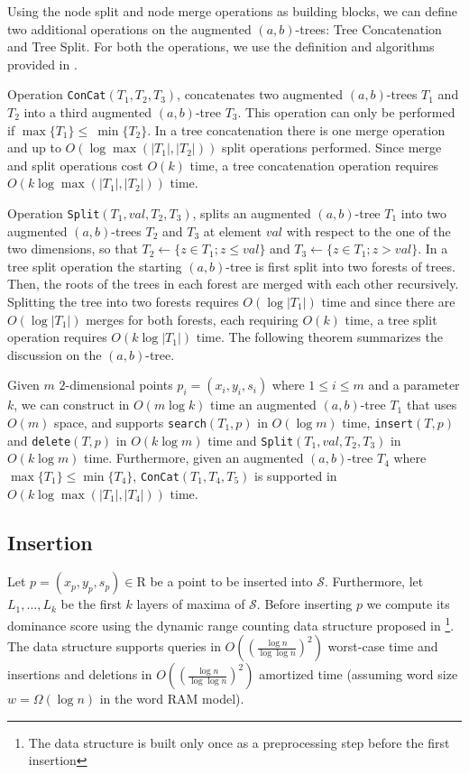 \documentclass{llncs}
\begin{document}
Using the node split and node merge operations as building blocks, we can define two additional operations on the augmented $(a,b)$-trees: Tree Concatenation and Tree Split. For both the operations, we use the definition and algorithms provided in \cite{Mehlhorn84}.

Operation \texttt{ConCat$(T_1,T_2,T_3)$}, concatenates two augmented $(a,b)$-trees $T_1$ and $T_2$ into a third augmented $(a,b)$-tree $T_3$. This operation can only be performed if $\max\{T_1\} \leq~ \min\{T_2\}$. In a tree concatenation there is one merge operation and up to $O(\log{\max(|T_1|,|T_2|)})$ split operations performed. Since merge and split operations cost $O(k)$ time, a tree concatenation operation requires $O(k\log{\max(|T_1|,|T_2|)})$ time.

Operation \texttt{Split$(T_1,val,T_2,T_3)$}, splits an augmented $(a,b)$-tree $T_1$ into two augmented $(a,b)$-trees $T_2$ and $T_3$ at element $val$ with respect to the one of the two dimensions, so that $T_2\leftarrow\{ z\in T_1; z\leq val\}$ and $T_3\leftarrow\{ z\in T_1; z> val\}$. In a tree split operation the starting $(a,b)$-tree is first split into two forests of trees. Then, the roots of the trees in each forest are merged with each other recursively. Splitting the tree into two forests requires $O(\log |T_1|)$ time and since there are $O(\log |T_1|)$ merges for both forests, each requiring $O(k)$ time, a tree split operation requires $O(k\log |T_1|)$ time. The following theorem summarizes the discussion on the $(a,b)$-tree.

\begin{theorem} \label{theorem:AugABTreeCombined}
Given $m$ $2$-dimensional points $p_i = (x_i,y_i,s_i)$ where $1 \leq i \leq m$ and a parameter $k$, we can construct in $O(m\log{k})$ time an augmented $(a,b)$-tree $T_1$ that uses $O(m)$ space, and supports \texttt{search$(T_1,p)$} in $O(\log{m})$ time, \texttt{insert$(T,p)$} and \texttt{delete$(T,p)$} in $O(k\log{m})$ time and \texttt{Split$(T_1,val,T_2,T_3)$} in $O(k\log{m})$ time. Furthermore, given an augmented $(a,b)$-tree $T_4$ where $\max\{T_1\} \leq \min\{T_4\}$, \texttt{ConCat$(T_1,T_4,T_5)$} is supported in $O(k\log{\max(|T_1|,|T_4|)})$ time.
\end{theorem}




\subsection{Insertion} \label{subsection:Insertion}
Let $p=(x_p,y_p,s_p)\in\mathrm{R}$ be a point to be inserted into $\mathcal{S}$. Furthermore, let $L_1, \ldots, L_k$ be the first $k$ layers of maxima of $\mathcal{S}$. Before inserting $p$ we compute its dominance score using the dynamic range counting data structure proposed in \cite{HeMunroWADS11}\footnote{The data structure is built only once as a preprocessing step before the first insertion}. The data structure supports queries in $O((\frac{\log n}{\log\log n})^{2})$ worst-case time and insertions and deletions in $O((\frac{\log n}{\log\log n})^{2})$ amortized time (assuming word size $w=\Omega(\log n)$ in the word RAM model).
\end{document}
